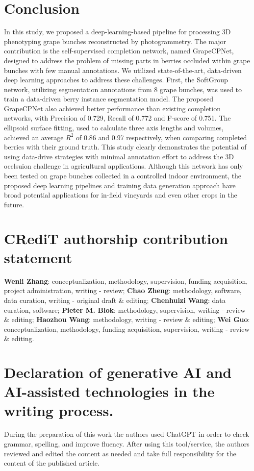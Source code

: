 \documentclass[12pt]{article}
\begin{document}
\section{Conclusion}

In this study, we proposed a deep-learning-based pipeline for processing 3D phenotyping grape bunches reconstructed by photogrammetry.
The major contribution is the self-supervised completion network, named GrapeCPNet, designed to address the problem of missing parts in berries occluded within grape bunches with few manual annotations.
We utilized state-of-the-art, data-driven deep learning approaches to address these challenges.
First, the SoftGroup network, utilizing segmentation annotations from 8 grape bunches, was used to train a data-driven berry instance segmentation model.
The proposed GrapeCPNet also achieved better performance than existing completion networks, with Precision of 0.729, Recall of 0.772 and F-score of 0.751.
The ellipsoid surface fitting, used to calculate three axis lengths and volumes, achieved an average $R^2$ of 0.86 and 0.97 respectively, when comparing completed berries with their ground truth.
This study clearly demonstrates the potential of using data-drive strategies with minimal annotation effort to address the 3D occlsuion challenge in agricultural applications.
Although this network has only been tested on grape bunches collected in a controlled indoor environment, the proposed deep learning pipelines and training data generation approach have broad potential applications for in-field vineyards and even other crops in the future.

\section*{CRediT authorship contribution statement}
\textbf{Wenli Zhang}: conceptualization, methodology, supervision, funding acquisition, project administration, writing - review; \textbf{Chao Zheng}: methodology, software, data curation, writing - original draft \& editing; \textbf{Chenhuizi Wang}: data curation, software; \textbf{Pieter M. Blok}: methodology, supervision, writing - review \& editing; \textbf{Haozhou Wang}: methodology, writing - review \& editing; \textbf{Wei Guo}: conceptualization, methodology, funding acquisition, supervision, writing - review \& editing.

\section*{Declaration of generative AI and AI-assisted technologies in the writing process.}
During the preparation of this work the authors used ChatGPT in order to check grammar, spelling, and improve fluency. After using this tool/service, the authors reviewed and edited the content as needed and take full responsibility for the content of the published article.
\end{document}
